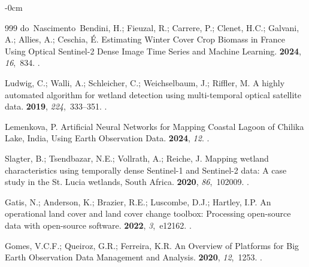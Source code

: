 \documentclass[coasts,article,accept,pdftex,moreauthors]{Definitions/mdpi}
\begin{document}
\begin{adjustwidth}{-\extralength}{0cm}
\begin{thebibliography}{999}
do~Nascimento~Bendini, H.; Fieuzal, R.; Carrere, P.; Clenet, H.C.; Galvani, A.;
  Allies, A.; Ceschia, {\'E}.
\newblock Estimating Winter Cover Crop Biomass in France Using Optical
  Sentinel-2 Dense Image Time Series and Machine Learning.
 {\bf 2024}, {\em 16},~834.
.

Ludwig, C.; Walli, A.; Schleicher, C.; Weichselbaum, J.; Riffler, M.
\newblock A highly automated algorithm for wetland detection using
  multi-temporal optical satellite data.
 {\bf 2019}, {\em 224},~333--351.
.

Lemenkova, P.
\newblock Artificial Neural Networks for Mapping Coastal Lagoon of Chilika
  Lake, India, Using Earth Observation Data.
 {\bf 2024}, {\em 12}.
.

Slagter, B.; Tsendbazar, N.E.; Vollrath, A.; Reiche, J.
\newblock Mapping wetland characteristics using temporally dense {Sentinel-1}
  and {Sentinel-2} data: {A} case study in the {St. Lucia} wetlands, {South
  Africa}.
 {\bf 2020}, {\em 86},~102009.
.

Gatis, N.; Anderson, K.; Brazier, R.E.; Luscombe, D.J.; Hartley, I.P.
\newblock An operational land cover and land cover change toolbox: Processing
  open-source data with open-source software.
 {\bf 2022}, {\em 3},~e12162.
.

Gomes, V.C.F.; Queiroz, G.R.; Ferreira, K.R.
\newblock An Overview of Platforms for Big Earth Observation Data Management and
  Analysis.
 {\bf 2020}, {\em 12},~1253.
.


\end{thebibliography}
\end{adjustwidth}
\end{document}
